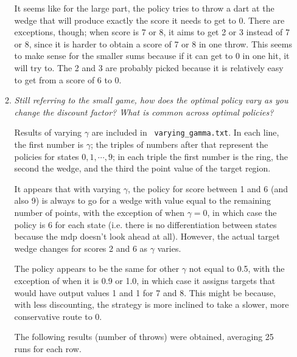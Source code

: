 \documentclass{article}
\newcommand{\edit}[1]{\colorbox{Yellow}{#1}}
\begin{document}
\begin{enumerate}
\begin{enumerate}
    It seems like for the large part, the policy tries to throw a dart
    at the wedge that will produce exactly the score it needs to get
    to 0.  There are exceptions, though; when score is 7 or 8, it aims
    to get 2 or 3 instead of 7 or 8, since it is harder to obtain a
    score of 7 or 8 in one throw. This seems to make sense for the
    smaller sums because if it can get to 0 in one hit, it will try
    to. The 2 and 3 are probably picked because it is relatively easy
    to get from a score of 6 to 0.

  \item \emph{Still referring to the small game, how does the optimal
    policy vary as you change the discount factor? What is common
    across optimal policies?}

    Results of varying $\gamma$ are included in {\tt
      varying\_gamma.txt}. In each line, the first number is $\gamma$;
    the triples of numbers after that represent the policies for
    states $0,1,\cdots,9$; in each triple the first number is the
    ring, the second the wedge, and the third the point value of the
    target region.

    It appears that with varying $\gamma$, the policy for score
    between 1 and 6 (and also 9) is always to go for a wedge with
    value equal to the remaining number of points, with the exception
    of when $\gamma=0$, in which case the policy is 6 for each state
    (i.e. there is no differentiation between states because the mdp
    doesn't look ahead at all). However, the actual target wedge
    changes for scores 2 and 6 as $\gamma$ varies.

    The policy appears to be the same for
    other $\gamma$ not equal to 0.5, with the exception of when it is
    0.9 or 1.0, in which case it assigns targets that would have
    output values 1 and 1 for 7 and 8. This might be because, with
    less discounting, the strategy is more inclined to take a slower,
    more conservative route to 0.


    The following results (number of throws) were obtained, averaging
    25 runs for each row.



\end{enumerate}
\end{enumerate}
\end{document}
